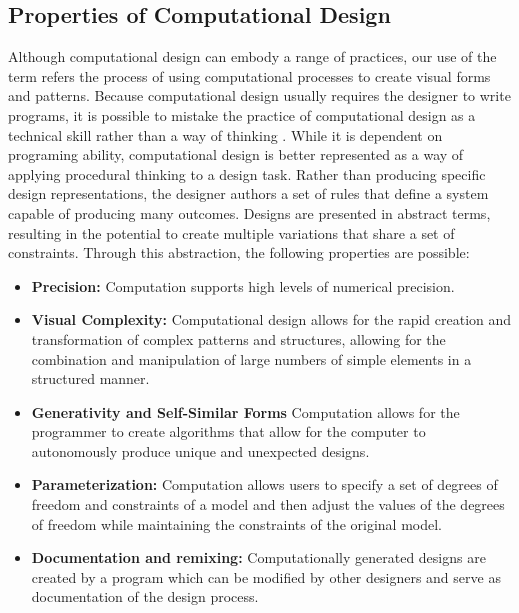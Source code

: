 \documentclass{sigchi}
\begin{document}
\subsection{Properties of Computational Design}
Although computational design can embody a range of practices, our use of the term refers the process of using computational processes to create visual forms and patterns. Because computational design usually requires the designer to write programs, it is possible to mistake the practice of computational design as a technical skill rather than a way of thinking \cite{reas}. While it is dependent on programing ability, computational design is better represented as a way of applying procedural thinking to a design task. Rather than producing specific design representations, the designer authors a set of rules that define a system capable of producing many outcomes. Designs are presented in abstract terms, resulting in the potential to create multiple variations that share a set of constraints. Through this abstraction, the following properties are possible:
\begin{itemize}
\item \textbf{Precision:} Computation supports high levels of numerical precision.
\item \textbf{Visual Complexity:} Computational design allows for the rapid creation and transformation of complex patterns and structures, allowing for the combination and manipulation of large numbers of simple elements in a structured manner. 
\item \textbf{Generativity and Self-Similar Forms} Computation allows for the programmer to create algorithms that allow for the computer to autonomously produce unique and unexpected designs.
\item \textbf{Parameterization:} Computation allows users to specify a set of degrees of freedom and constraints of a model and then adjust the values of the degrees of freedom while maintaining the constraints of the original model.
\item \textbf{Documentation and remixing:} Computationally generated designs are created by a program which can be modified by other designers and serve as documentation of the design process. 
\end{itemize}	
\end{document}
